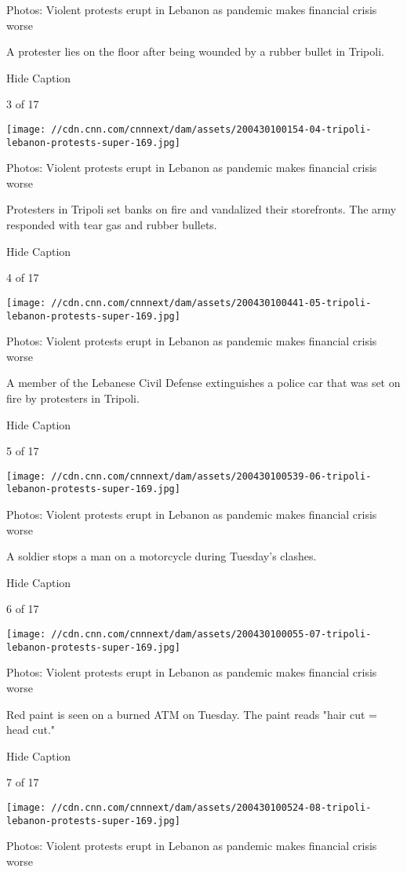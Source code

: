 Photos: Violent protests erupt in Lebanon as pandemic makes financial
crisis worse

A protester lies on the floor after being wounded by a rubber bullet in
Tripoli.

Hide Caption

3 of 17

\texttt{[image: //cdn.cnn.com/cnnnext/dam/assets/200430100154-04-tripoli-lebanon-protests-super-169.jpg]}

Photos: Violent protests erupt in Lebanon as pandemic makes financial
crisis worse

Protesters in Tripoli set banks on fire and vandalized their
storefronts. The army responded with tear gas and rubber bullets.

Hide Caption

4 of 17

\texttt{[image: //cdn.cnn.com/cnnnext/dam/assets/200430100441-05-tripoli-lebanon-protests-super-169.jpg]}

Photos: Violent protests erupt in Lebanon as pandemic makes financial
crisis worse

A member of the Lebanese Civil Defense extinguishes a police car that
was set on fire by protesters in Tripoli.

Hide Caption

5 of 17

\texttt{[image: //cdn.cnn.com/cnnnext/dam/assets/200430100539-06-tripoli-lebanon-protests-super-169.jpg]}

Photos: Violent protests erupt in Lebanon as pandemic makes financial
crisis worse

A soldier stops a man on a motorcycle during Tuesday's clashes.

Hide Caption

6 of 17

\texttt{[image: //cdn.cnn.com/cnnnext/dam/assets/200430100055-07-tripoli-lebanon-protests-super-169.jpg]}

Photos: Violent protests erupt in Lebanon as pandemic makes financial
crisis worse

Red paint is seen on a burned ATM on Tuesday. The paint reads "hair cut
= head cut."

Hide Caption

7 of 17

\texttt{[image: //cdn.cnn.com/cnnnext/dam/assets/200430100524-08-tripoli-lebanon-protests-super-169.jpg]}

Photos: Violent protests erupt in Lebanon as pandemic makes financial
crisis worse

